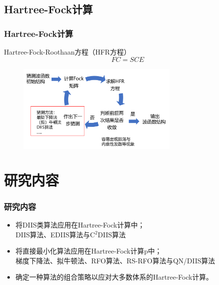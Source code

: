 \documentclass[10pt,aspectratio=43,mathserif,UTF8]{beamer}
\begin{document}
\subsection{Hartree-Fock计算}
\begin{frame}
\frametitle{Hartree-Fock计算}
Hartree-Fock-Roothaan方程（HFR方程）
\begin{equation}
	FC=SCE
\end{equation}

\begin{figure}[htbp]
	\centering
	\includegraphics[width=0.7\textwidth]{figure/HF/HF_process3.png}
\end{figure}
\end{frame}


\section{研究内容}
\begin{frame}
\frametitle{研究内容}
	\begin{itemize}
		\item 将DIIS类算法应用在Hartree-Fock计算中；\\
		DIIS算法、EDIIS算法与C$^2$DIIS算法
		\item 将直接最小化算法应用在Hartree-Fock计算p中；\\
		梯度下降法、拟牛顿法、RFO算法、RS-RFO算法与QN/DIIS算法
		\item 确定一种算法的组合策略以应对大多数体系的Hartree-Fock计算。
	\end{itemize}

\end{frame}


\end{document}
